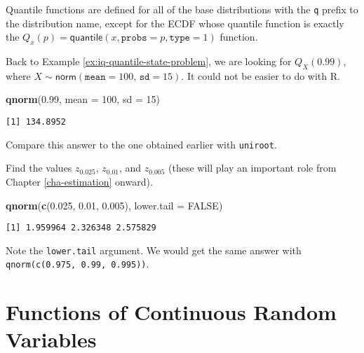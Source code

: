 \documentclass[]{book}
\newenvironment{Shaded}{\begin{snugshade}}{\end{snugshade}}
\newcommand{\KeywordTok}[1]{\textcolor[rgb]{0.13,0.29,0.53}{\textbf{{#1}}}}
\newcommand{\DataTypeTok}[1]{\textcolor[rgb]{0.13,0.29,0.53}{{#1}}}
\newcommand{\DecValTok}[1]{\textcolor[rgb]{0.00,0.00,0.81}{{#1}}}
\newcommand{\FloatTok}[1]{\textcolor[rgb]{0.00,0.00,0.81}{{#1}}}
\newcommand{\OtherTok}[1]{\textcolor[rgb]{0.56,0.35,0.01}{{#1}}}
\newcommand{\NormalTok}[1]{{#1}}
\numberwithin{equation}{chapter}
\numberwithin{figure}{chapter}
\theoremstyle{plain}
\theoremstyle{definition}
\theoremstyle{remark}
\theoremstyle{definition}
\theoremstyle{definition}
\theoremstyle{remark}
\let\BeginKnitrBlock\begin \let\EndKnitrBlock\end
\begin{document}
Quantile functions are defined for all of the base distributions with
the \texttt{q} prefix to the distribution name, except for the ECDF
whose quantile function is exactly the
\(Q_{x}(p) = \mathsf{quantile}(x, \mathtt{probs} = p, \mathtt{type} = 1)\)
function.

\bigskip

\BeginKnitrBlock{example}
\protect\hypertarget{ex:unnamed-chunk-275}{}{\label{ex:unnamed-chunk-275}}Back
to Example \ref{ex:iq-quantile-state-problem}, we are looking for
\(Q_{X}(0.99)\), where
\(X\sim\mathsf{norm}(\mathtt{mean}=100,\,\mathtt{sd}=15)\). It could not
be easier to do with R.
\EndKnitrBlock{example}

\begin{Shaded}
\begin{Highlighting}[]
\KeywordTok{qnorm}\NormalTok{(}\FloatTok{0.99}\NormalTok{, }\DataTypeTok{mean =} \DecValTok{100}\NormalTok{, }\DataTypeTok{sd =} \DecValTok{15}\NormalTok{)}
\end{Highlighting}
\end{Shaded}

\begin{verbatim}
[1] 134.8952
\end{verbatim}

Compare this answer to the one obtained earlier with \texttt{uniroot}.

\bigskip

\BeginKnitrBlock{example}
\protect\hypertarget{ex:unnamed-chunk-277}{}{\label{ex:unnamed-chunk-277}}Find
the values \(z_{0.025}\), \(z_{0.01}\), and \(z_{0.005}\) (these will
play an important role from Chapter \ref{cha-estimation} onward).
\EndKnitrBlock{example}

\begin{Shaded}
\begin{Highlighting}[]
\KeywordTok{qnorm}\NormalTok{(}\KeywordTok{c}\NormalTok{(}\FloatTok{0.025}\NormalTok{, }\FloatTok{0.01}\NormalTok{, }\FloatTok{0.005}\NormalTok{), }\DataTypeTok{lower.tail =} \OtherTok{FALSE}\NormalTok{)}
\end{Highlighting}
\end{Shaded}

\begin{verbatim}
[1] 1.959964 2.326348 2.575829
\end{verbatim}

Note the \texttt{lower.tail} argument. We would get the same answer with
\texttt{qnorm(c(0.975,\ 0.99,\ 0.995))}.

\section{Functions of Continuous Random
Variables}\label{sec-functions-of-continuous}
\end{document}

